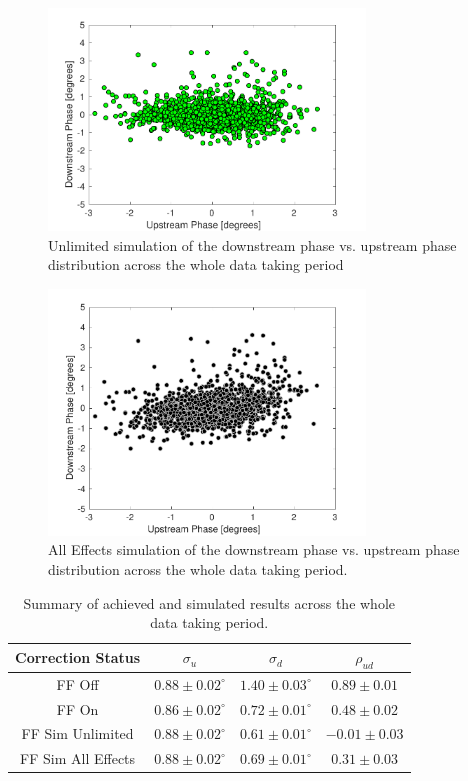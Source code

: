 \begin{figure}
  \centering
  \includegraphics[width=0.75\textwidth]{Figures/feedforward/longFF_scatterFFSimOpt}
  \caption{Unlimited simulation of the downstream phase vs. upstream phase distribution across the whole data taking period}
  \label{f:longFF_scatterFFSimOpt}
\end{figure}

\begin{figure}
  \centering
  \includegraphics[width=0.75\textwidth]{Figures/feedforward/longFF_scatterFFSimReal}
  \caption{All Effects simulation of the downstream phase vs. upstream phase distribution across the whole data taking period.}
  \label{f:longFF_scatterFFSimReal}
\end{figure}

\begin{table}
  \begin{center}
    \begin{tabular}{| c c c c |}
	   \hline
       Correction Status & \(\sigma_u\) & \(\sigma_d\) & \(\rho_{ud}\) \\ \hline
       FF Off & \(0.88\pm0.02^\circ\) & \(1.40\pm0.03^\circ\) & \(0.89\pm0.01\) \\
	   FF On & \(0.86\pm0.02^\circ\) & \(0.72\pm0.01^\circ\) & \(0.48\pm0.02\) \\
	   FF Sim Unlimited & \(0.88\pm0.02^\circ\) & \(0.61\pm0.01^\circ\) & \(-0.01\pm0.03\) \\
	   FF Sim All Effects & \(0.88\pm0.02^\circ\) & \(0.69\pm0.01^\circ\) & \(0.31\pm0.03\) \\
    \hline
    \end{tabular}
    \caption{Summary of achieved and simulated results across the whole data taking period.}
  	\label{t:LongFF}
  \end{center}
\end{table}